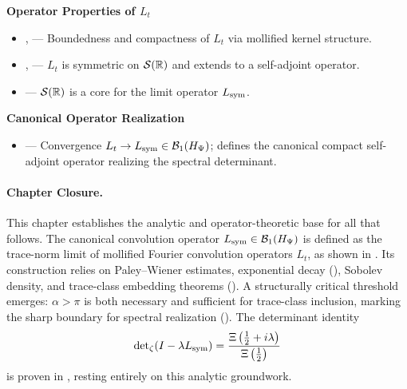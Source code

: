 \textbf{Operator Properties of \texorpdfstring{\( L_t \)}{Lt}}
\begin{itemize}
  \item {},  — Boundedness and compactness of \( L_t \) via mollified kernel structure.
  \item {},  — \( L_t \) is symmetric on \( \mathcal{S}(\mathbb{R}) \) and extends to a self-adjoint operator.
  \item {} — \( \mathcal{S}(\mathbb{R}) \) is a core for the limit operator \( L_{\mathrm{sym}} \).
\end{itemize}

\textbf{Canonical Operator Realization}
\begin{itemize}
  \item {} — Convergence \( L_t \to L_{\mathrm{sym}} \in \mathcal{B}_1(H_{\Psi}) \); defines the canonical compact self-adjoint operator realizing the spectral determinant.
\end{itemize}

\paragraph{Chapter Closure.}
This chapter establishes the analytic and operator-theoretic base for all that follows. The canonical convolution operator \( L_{\mathrm{sym}} \in \mathcal{B}_1(H_{\Psi}) \) is defined as the trace-norm limit of mollified Fourier convolution operators \( L_t \), as shown in . Its construction relies on Paley--Wiener estimates, exponential decay (), Sobolev density, and trace-class embedding theorems (). A structurally critical threshold emerges: \( \alpha > \pi \) is both necessary and sufficient for trace-class inclusion, marking the sharp boundary for spectral realization (). The determinant identity
\[
\det\nolimits_{\zeta}(I - \lambda L_{\mathrm{sym}})
= \frac{\Xi\left(\tfrac{1}{2} + i\lambda \right)}{\Xi\left(\tfrac{1}{2} \right)}
\]
is proven in , resting entirely on this analytic groundwork.
